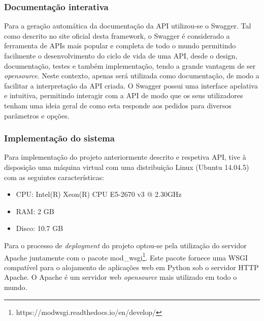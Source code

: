 \subsubsection{Documentação interativa}


Para a geração automática da documentação da API utilizou-se o Swagger. Tal como descrito no site oficial desta framework\cite{SmartBearSoftware2017}, o Swagger é considerado a ferramenta de APIs mais popular e completa de todo o mundo permitindo facilmente o desenvolvimento do ciclo de vida de uma \ac{API}, desde o design, documentação, testes e também implementação, tendo a grande vantagem de ser \textit{opensource}. Neste contexto, apenas será utilizada como documentação, de modo a facilitar a interpretação da \ac{API} criada. O Swagger possui uma interface apelativa e intuitiva, permitindo interagir com a \ac{API} de modo que os seus utilizadores tenham uma ideia geral de como esta responde aos pedidos para diversos parâmetros e opções. 





\subsubsection{Implementação do sistema}

Para implementação do projeto anteriormente descrito e respetiva API, tive à disposição uma máquina virtual com uma distribuição Linux (Ubuntu 14.04.5) com as seguintes características: 

\begin{itemize}
	\item \ac{CPU}: Intel(R) Xeon(R) CPU E5-2670 v3 @ 2.30GHz
	\item \ac{RAM}: 2 GB
	\item Disco: 10.7 GB
\end{itemize}


Para o processo de \textit{deployment} do projeto optou-se pela utilização do servidor Apache juntamente com o pacote mod\_wsgi\footnote{https://modwsgi.readthedocs.io/en/develop/}. 
Este pacote fornece uma \ac{WSGI} compatível para o alojamento de aplicações web em Python sob o servidor \ac{HTTP} Apache. O Apache é um servidor web \textit{opensource} mais utilizado em todo o mundo\cite{TheApacheSoftwareFoundation2016}.












